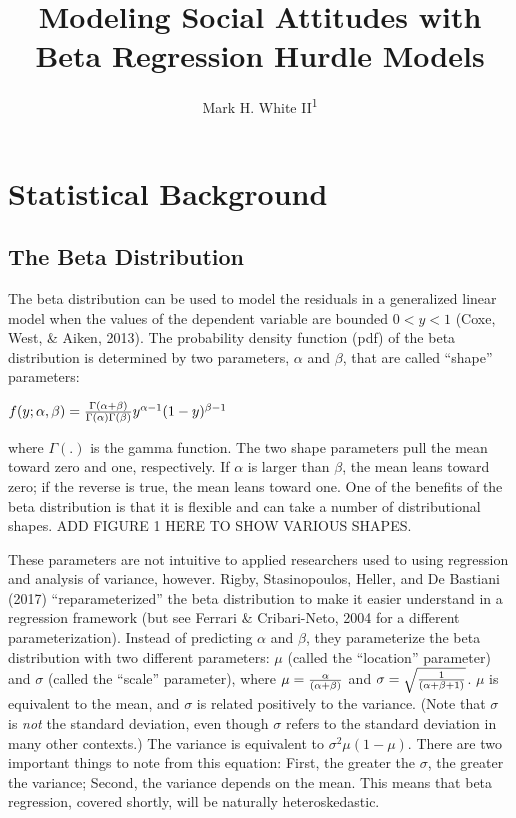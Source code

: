 \documentclass[english,man]{apa6}
\title{Modeling Social Attitudes with Beta Regression Hurdle Models}
\author{Mark H. White II\textsuperscript{1}}
\affiliation{
    \vspace{0.5cm}
          \textsuperscript{1} University of Kansas  }
\theoremstyle{definition}
\theoremstyle{definition}
\theoremstyle{remark}
\begin{document}
\maketitle

\setcounter{secnumdepth}{0}



\section{Statistical Background}\label{statistical-background}

\subsection{The Beta Distribution}\label{the-beta-distribution}

The beta distribution can be used to model the residuals in a
generalized linear model when the values of the dependent variable are
bounded \(0 < y < 1\) (Coxe, West, \& Aiken, 2013). The probability
density function (pdf) of the beta distribution is determined by two
parameters, \(\alpha\) and \(\beta\), that are called \enquote{shape}
parameters:

\begin{center}
$f(y;\alpha,\beta)={\Gamma(\alpha+\beta)\over\Gamma(\alpha)\Gamma(\beta)}y^{\alpha-1}(1-y)^{\beta-1}$
\end{center}

where \(\Gamma(.)\) is the gamma function. The two shape parameters pull
the mean toward zero and one, respectively. If \(\alpha\) is larger than
\(\beta\), the mean leans toward zero; if the reverse is true, the mean
leans toward one. One of the benefits of the beta distribution is that
it is flexible and can take a number of distributional shapes. ADD
FIGURE 1 HERE TO SHOW VARIOUS SHAPES.

These parameters are not intuitive to applied researchers used to using
regression and analysis of variance, however. Rigby, Stasinopoulos,
Heller, and De Bastiani (2017) \enquote{reparameterized} the beta
distribution to make it easier understand in a regression framework (but
see Ferrari \& Cribari-Neto, 2004 for a different parameterization).
Instead of predicting \(\alpha\) and \(\beta\), they parameterize the
beta distribution with two different parameters: \(\mu\) (called the
\enquote{location} parameter) and \(\sigma\) (called the \enquote{scale}
parameter), where \(\mu={\alpha\over(\alpha+\beta)}\) and
\(\sigma=\sqrt{1\over(\alpha+\beta+1)}\). \(\mu\) is equivalent to the
mean, and \(\sigma\) is related positively to the variance. (Note that
\(\sigma\) is \emph{not} the standard deviation, even though \(\sigma\)
refers to the standard deviation in many other contexts.) The variance
is equivalent to \(\sigma^2\mu(1-\mu)\). There are two important things
to note from this equation: First, the greater the \(\sigma\), the
greater the variance; Second, the variance depends on the mean. This
means that beta regression, covered shortly, will be naturally
heteroskedastic.
\end{document}
